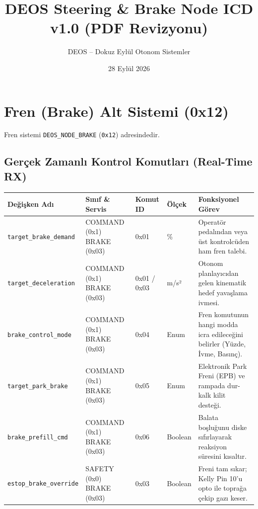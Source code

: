 \documentclass[a4paper,10pt]{article}
\title{\textbf{DEOS Steering \& Brake Node ICD}\\
\large v1.0 (PDF Revizyonu)}
\author{DEOS -- Dokuz Eylül Otonom Sistemler}
\date{28 Eylül 2026}
\newcommand{\hex}[1]{\texttt{0x#1}}
\newcommand{\code}[1]{\texttt{#1}}
\begin{document}
\maketitle

\section{Fren (Brake) Alt Sistemi (0x12)}

Fren sistemi \code{DEOS\_NODE\_BRAKE} (\hex{12}) adresindedir.

\subsection{Gerçek Zamanlı Kontrol Komutları (Real-Time RX)}

\begin{center}
\begin{tabularx}{\textwidth}{>{\raggedright\arraybackslash}p{3.8cm} >{\raggedright\arraybackslash}p{3cm} >{\raggedright\arraybackslash}p{2.2cm} >{\raggedright\arraybackslash}p{2.2cm} X}
\toprule
\textbf{Değişken Adı} & \textbf{Sınıf \& Servis} & \textbf{Komut ID} & \textbf{Ölçek} & \textbf{Fonksiyonel Görev} \\
\midrule
\code{target\_brake\_demand} & COMMAND (0x1) BRAKE (0x03) & 0x01 & 0.01 \% & Operatör pedalından veya üst kontrolcüden ham fren talebi. \\
\code{target\_deceleration} & COMMAND (0x1) BRAKE (0x03) & 0x01 / 0x03 & 0.01 m/s² & Otonom planlayıcıdan gelen kinematik hedef yavaşlama ivmesi. \\
\code{brake\_control\_mode} & COMMAND (0x1) BRAKE (0x03) & 0x04 & Enum & Fren komutunun hangi modda icra edileceğini belirler (Yüzde, İvme, Basınç). \\
\code{target\_park\_brake} & COMMAND (0x1) BRAKE (0x03) & 0x05 & Enum & Elektronik Park Freni (EPB) ve rampada dur-kalk kilit desteği. \\
\code{brake\_prefill\_cmd} & COMMAND (0x1) BRAKE (0x03) & 0x06 & Boolean & Balata boşluğunu diske sıfırlayarak reaksiyon süresini kısaltır. \\
\code{estop\_brake\_override} & SAFETY (0x0) BRAKE (0x03) & 0x03 & Boolean & Freni tam sıkar; Kelly Pin 10'u opto ile toprağa çekip gazı keser. \\
\bottomrule
\end{tabularx}
\end{center}
\end{document}
